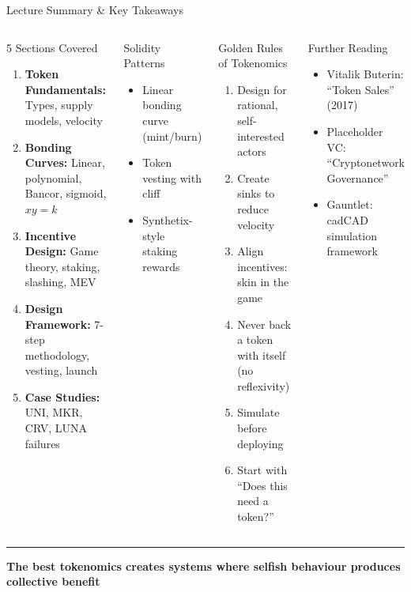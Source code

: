 \documentclass[8pt,aspectratio=169]{beamer}
\newcommand{\bottomnote}[1]{\vfill\vspace{-2mm}\textcolor{mllavender2}{\rule{\textwidth}{0.4pt}}\vspace{1mm}\footnotesize\textbf{#1}}
\begin{document}
\begin{frame}{Lecture Summary \& Key Takeaways}
\begin{columns}[T]
\begin{block}{5 Sections Covered}
\footnotesize
\begin{enumerate}
  \item \textbf{Token Fundamentals:} Types, supply models, velocity
  \item \textbf{Bonding Curves:} Linear, polynomial, Bancor, sigmoid, $xy=k$
  \item \textbf{Incentive Design:} Game theory, staking, slashing, MEV
  \item \textbf{Design Framework:} 7-step methodology, vesting, launch
  \item \textbf{Case Studies:} UNI, MKR, CRV, LUNA failures
\end{enumerate}
\end{block}
\vspace{2mm}
\begin{exampleblock}{\footnotesize Solidity Patterns}
\footnotesize
\begin{itemize}
  \item Linear bonding curve (mint/burn)
  \item Token vesting with cliff
  \item Synthetix-style staking rewards
\end{itemize}
\end{exampleblock}

\begin{block}{Golden Rules of Tokenomics}
\footnotesize
\begin{enumerate}
  \item Design for rational, self-interested actors
  \item Create sinks to reduce velocity
  \item Align incentives: skin in the game
  \item Never back a token with itself (no reflexivity)
  \item Simulate before deploying
  \item Start with ``Does this need a token?''
\end{enumerate}
\end{block}
\vspace{2mm}
\begin{block}{Further Reading}
\footnotesize
\begin{itemize}
  \item Vitalik Buterin: ``Token Sales'' (2017)
  \item Placeholder VC: ``Cryptonetwork Governance''
  \item Gauntlet: cadCAD simulation framework
\end{itemize}
\end{block}
\end{columns}
\bottomnote{The best tokenomics creates systems where selfish behaviour produces collective benefit}
\end{frame}
\end{document}
